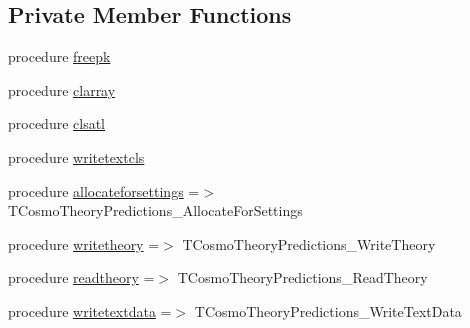 \subsection*{Private Member Functions}
\begin{DoxyCompactItemize}
\item 
procedure \mbox{\hyperlink{structcosmotheory_1_1tcosmotheorypredictions_a6d1c83ef7c17264b61d4bb6728a60cf6}{freepk}}
\item 
procedure \mbox{\hyperlink{structcosmotheory_1_1tcosmotheorypredictions_a29c34b6cc7598a2837c774bef24fad0d}{clarray}}
\item 
procedure \mbox{\hyperlink{structcosmotheory_1_1tcosmotheorypredictions_afe9a29bec8147604c638ff7722d8c3fc}{clsatl}}
\item 
procedure \mbox{\hyperlink{structcosmotheory_1_1tcosmotheorypredictions_a89e2cc577273fce982acd570ed81f8be}{writetextcls}}
\item 
procedure \mbox{\hyperlink{structcosmotheory_1_1tcosmotheorypredictions_a626a5dcd9f981234534db43ae45b8fb1}{allocateforsettings}} =$>$ T\+Cosmo\+Theory\+Predictions\+\_\+\+Allocate\+For\+Settings
\item 
procedure \mbox{\hyperlink{structcosmotheory_1_1tcosmotheorypredictions_a7b46af68aa2465a9a2e197742e50fc49}{writetheory}} =$>$ T\+Cosmo\+Theory\+Predictions\+\_\+\+Write\+Theory
\item 
procedure \mbox{\hyperlink{structcosmotheory_1_1tcosmotheorypredictions_ae63ade8083ca78d9fc7121e81d6f3772}{readtheory}} =$>$ T\+Cosmo\+Theory\+Predictions\+\_\+\+Read\+Theory
\item 
procedure \mbox{\hyperlink{structcosmotheory_1_1tcosmotheorypredictions_a453a8cf7f4f1cc505b5acf635f5654ac}{writetextdata}} =$>$ T\+Cosmo\+Theory\+Predictions\+\_\+\+Write\+Text\+Data
\end{DoxyCompactItemize}
